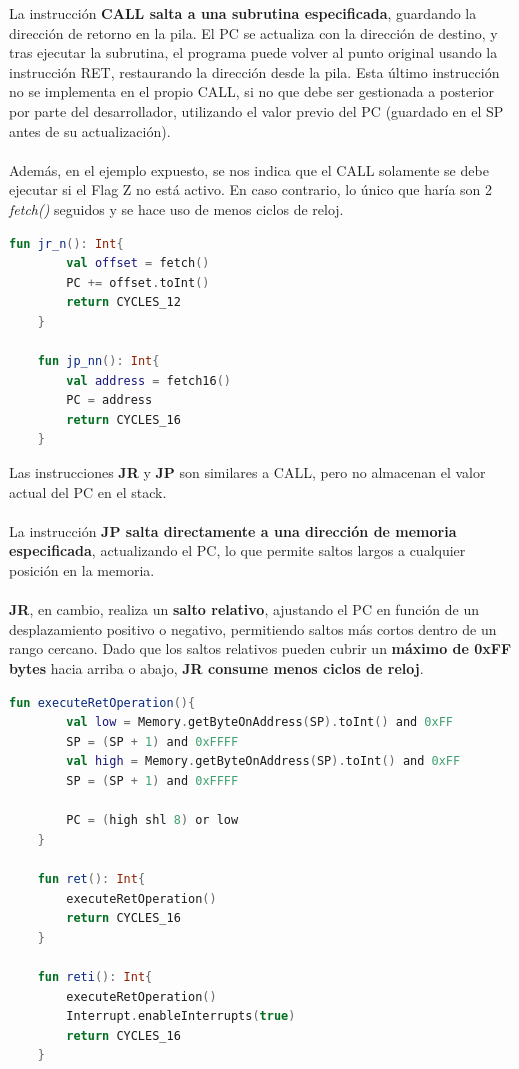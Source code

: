 La instrucción \textbf{CALL salta a una subrutina especificada}, guardando la dirección de retorno en la pila. El PC se actualiza con la dirección de destino, y tras ejecutar la subrutina, el programa puede volver al punto original usando la instrucción RET, restaurando la dirección desde la pila. Esta último instrucción no se implementa en el propio CALL, si no que debe ser gestionada a posterior por parte del desarrollador, utilizando el valor previo del PC (guardado en el SP antes de su actualización).
\\\\
Además, en el ejemplo expuesto, se nos indica que el CALL solamente se debe ejecutar si el Flag Z no está activo. En caso contrario, lo único que haría son 2 \textit{fetch()} seguidos y se hace uso de menos ciclos de reloj.

\begin{lstlisting}[language=Kotlin, caption={Operaciones JR y JP}, label={code:kotlinjpjr}]
    fun jr_n(): Int{
        val offset = fetch()
        PC += offset.toInt()
        return CYCLES_12
    }

    fun jp_nn(): Int{
        val address = fetch16()
        PC = address
        return CYCLES_16
    }
\end{lstlisting}

Las instrucciones \textbf{JR} y \textbf{JP} son similares a CALL, pero no almacenan el valor actual del PC en el stack. 
\\\\
La instrucción \textbf{JP salta directamente a una dirección de memoria especificada}, actualizando el PC, lo que permite saltos largos a cualquier posición en la memoria. 
\\\\
\textbf{JR}, en cambio, realiza un \textbf{salto relativo}, ajustando el PC en función de un desplazamiento positivo o negativo, permitiendo saltos más cortos dentro de un rango cercano. Dado que los saltos relativos pueden cubrir un \textbf{máximo de 0xFF bytes} hacia arriba o abajo, \textbf{JR consume menos ciclos de reloj}.

\begin{lstlisting}[language=Kotlin, caption={Operaciones RET y RETI}, label={code:kotlinreti}]
    fun executeRetOperation(){
        val low = Memory.getByteOnAddress(SP).toInt() and 0xFF
        SP = (SP + 1) and 0xFFFF
        val high = Memory.getByteOnAddress(SP).toInt() and 0xFF
        SP = (SP + 1) and 0xFFFF

        PC = (high shl 8) or low
    }

    fun ret(): Int{
        executeRetOperation()
        return CYCLES_16
    }

    fun reti(): Int{
        executeRetOperation()
        Interrupt.enableInterrupts(true)
        return CYCLES_16
    }
\end{lstlisting}

